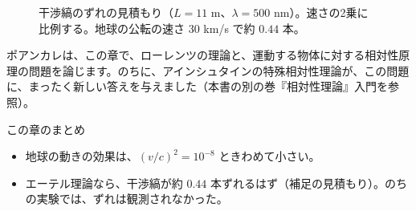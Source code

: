 \documentclass[a4paper,11pt,openany]{ltjsbook}
\begin{document}
\begin{figure}[htbp]
\centering
{}
\caption{干渉縞のずれの見積もり（$L=11$ m、$\lambda=500$ nm）。速さの2乗に比例する。地球の公転の速さ $30$ km/s で約 $0.44$ 本。}
\end{figure}

ポアンカレは、この章で、ローレンツの理論と、運動する物体に対する相対性原理の問題を論じます。のちに、アインシュタインの特殊相対性理論が、この問題に、まったく新しい答えを与えました（本書の別の巻『相対性理論』入門を参照）。

\begin{pointbox}{この章のまとめ}
\begin{itemize}[leftmargin=*]
\item 地球の動きの効果は、$(v/c)^2=10^{-8}$ ときわめて小さい。
\item エーテル理論なら、干渉縞が約 $0.44$ 本ずれるはず（補足の見積もり）。のちの実験では、ずれは観測されなかった。
\end{itemize}
\end{pointbox}
\end{document}
